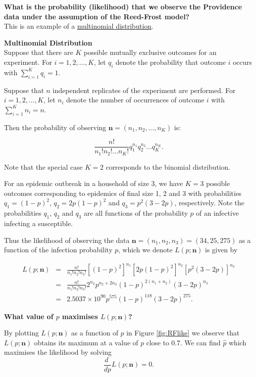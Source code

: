 \documentclass[
]{book}
\begin{document}
{\textbf{What is the probability (likelihood) that we observe the Providence data under the assumption of the Reed-Frost model?}}\\
This is an example of a \protect\hyperlink{def:multinomial}{multinomial distribution}.

\leavevmode{}%
{\textbf{Multinomial Distribution}}\\
Suppose that there are \(K\) possible mutually exclusive outcomes for an experiment. For \(i=1,2,\ldots,K\), let \(q_i\) denote the probability that outcome \(i\) occurs with \(\sum_{i=1}^K q_i = 1\).

Suppose that \(n\) independent replicates of the experiment are performed. For \(i=1,2,\ldots,K\), let \(n_i\) denote the number of occurrences of outcome \(i\) with \(\sum_{i=1}^K n_i = n\).

Then the probability of observing \(\mathbf{n} =(n_1, n_2, \ldots, n_K)\) is:

\[ \frac{n!}{n_1! n_2! \ldots n_K!} q_1^{n_1} q_2^{n_2} \ldots q_K^{n_K}.\]

Note that the special case \(K=2\) corresponds to the binomial distribution.

For an epidemic outbreak in a household of size 3, we have \(K=3\) possible outcomes corresponding to epidemics of final size 1, 2 and 3 with probabilities \(q_1 = (1-p)^2\), \(q_2 = 2p(1-p)^2\) and \(q_3 = p^2 (3-2p)\), respectively. Note the probabilities \(q_1\), \(q_2\) and \(q_3\) are all functions of the probability \(p\) of an infective infecting a susceptible.

Thus the likelihood of observing the data \(\mathbf{n} = (n_1, n_2, n_3) = (34,25,275)\) as a function of the infection probability \(p\), which we denote \(L (p; \mathbf{n})\) is given by

\begin{eqnarray*}
L(p; \mathbf{n}) &=& \frac{n!}{n_1! n_2! n_3!} \left[ (1-p)^2 \right]^{n_1} \left[ 2 p (1-p)^2 \right]^{n_2} \left[ p^2(3- 2p) \right]^{n_3} \\
&=& \frac{n!}{n_1! n_2! n_3!} 2^{n_2} p^{n_2 + 2 n_3} (1-p)^{2(n_1 + n_2)} (3-2p)^{n_3} \\
&=& 2.5037 \times 10^{90} p^{575} (1-p)^{118} (3-2p)^{275}.
\end{eqnarray*}

{\textbf{What value of \(p\) maximises \(L(p; \mathbf{n})\)?}}

By plotting \(L(p; \mathbf{n})\) as a function of \(p\) in Figure \ref{fig:RFlike} we observe that \(L(p;\mathbf{n})\) obtains its maximum at a value of \(p\) close to 0.7. We can find \(\hat{p}\) which maximises the likelihood by solving
\[ \frac{d \;}{dp}L(p; \mathbf{n})=0. \]
\end{document}
